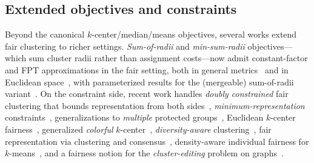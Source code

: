 \subsection{Extended objectives and constraints}
Beyond the canonical $k$-center/median/means objectives, several works extend fair clustering to richer settings. \emph{Sum-of-radii} and \emph{min-sum-radii} objectives---which sum cluster radii rather than assignment costs---now admit constant-factor and FPT approximations in the fair setting, both in general metrics~\citep{fairsumradii2025,fptminsumradii2024} and in Euclidean space~\citep{fairminsumradiieuclid2023}, with parameterized results for the (mergeable) sum-of-radii variant~\citep{mergeablesumradii2026}. On the constraint side, recent work handles \emph{doubly constrained} fair clustering that bounds representation from both sides~\citep{doublyconstrained2026}, \emph{minimum-representation} constraints~\citep{minrepconstraints2024}, generalizations to \emph{multiple} protected groups~\citep{multigroupfair2025}, Euclidean $k$-center fairness~\citep{euclideankcenterfair2025}, generalized \emph{colorful} $k$-center~\citep{colorfulkcenter2022}, \emph{diversity-aware} clustering~\citep{diversityaware2024}, fair representation via clustering and consensus~\citep{fairrepconsensus2025}, density-aware individual fairness for $k$-means~\citep{densityindivkmeans2025}, and a fairness notion for the \emph{cluster-editing} problem on graphs~\citep{modfairclusterediting2021}.

